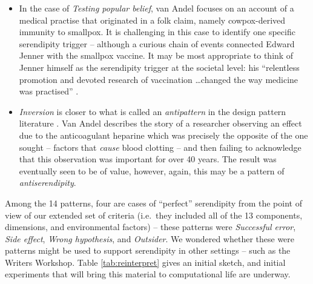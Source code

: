 \begin{itemize}
\item In the case of \emph{Testing popular belief}, van Andel focuses
  on an account of a medical practise that originated in a folk claim,
  namely cowpox-derived immunity to smallpox.  It is challenging in
  this case to identify one specific serendipity trigger -- although a
  curious chain of events connected Edward Jenner with the smallpox
  vaccine.  It may be most appropriate to think of Jenner himself as
  the serendipity trigger at the societal level: his ``relentless
  promotion and devoted research of vaccination \ldots changed the way
  medicine was practised'' \cite{riedel2005edward}.
\item \emph{Inversion} is closer to what is called an
  \emph{antipattern} in the design pattern literature
  \cite{brown1998antipatterns}.  Van Andel describes the story of a
  researcher observing an effect due to the anticoagulant heparine
  which was precisely the opposite of the one sought -- factors that
  \emph{cause} blood clotting -- and then failing to acknowledge that
  this observation was important for over 40 years.  The result was
  eventually seen to be of value, however, again, this may be a
  pattern of \emph{antiserendipity}.
\end{itemize}

Among the 14 patterns, four are cases of ``perfect'' serendipity from
the point of view of our extended set of criteria (i.e.~they included
all of the 13 components, dimensions, and environmental factors) --
these patterns were \emph{Successful error}, \emph{Side effect},
\emph{Wrong hypothesis}, and \emph{Outsider}.
%
We wondered whether these were patterns might be used to support
serendipity in other settings -- such as the Writers Workshop.  Table
\ref{tab:reinterpret} gives an initial sketch, and initial experiments
that will bring this material to computational life are underway.

